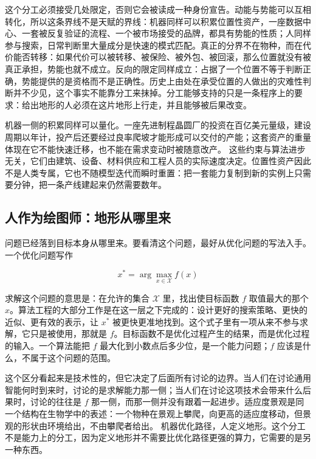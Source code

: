 这个分工必须接受几处限定，否则它会被读成一种身份宣告。动能与势能可以互相转化，所以这条界线不是天赋的界线：机器同样可以积累位置性资产，一座数据中心、一套被反复验证的流程、一个被市场接受的品牌，都具有势能的性质；人同样参与搜索，日常判断里大量成分是快速的模式匹配。真正的分界不在物种，而在代价能否转移：如果代价可以被转移、被保险、被外包、被回滚，那么位置就没有被真正承担，势能也就不成立。反向的限定同样成立：占据了一个位置不等于判断正确，势能提供的是资格而不是正确性。历史上由处在承受位置的人做出的灾难性判断并不少见，这个事实不能靠分工来抹掉。分工能够支持的只是一条程序上的要求：给出地形的人必须在这片地形上行走，并且能够被后果改变。

机器一侧的积累同样可以量化。一座先进制程晶圆厂的投资在百亿美元量级，建设周期以年计，投产后还要经过良率爬坡才能形成可以交付的产能；这套资产的重量体现在它不能快速迁移，也不能在需求变动时被随意改产。\cite{verheyde2019tsmc} 这些约束与算法进步无关，它们由建筑、设备、材料供应和工程人员的实际速度决定。位置性资产因此不是人类专属，它也不随模型迭代而瞬时重置：把一套能力复制到新的实例上只需要分钟，把一条产线建起来仍然需要数年。

\subsection{人作为绘图师：地形从哪里来}

问题已经落到目标本身从哪里来。要看清这个问题，最好从优化问题的写法入手。一个优化问题写作

\begin{equation}
x^{*} = \arg\max_{x \in \mathcal{X}} f(x)
\end{equation}

求解这个问题的意思是：在允许的集合 $\mathcal{X}$ 里，找出使目标函数 $f$ 取值最大的那个 $x$。算法工程的大部分工作是在这一层之下完成的：设计更好的搜索策略、更快的近似、更有效的表示，让 $x^{*}$ 被更快更准地找到。这个式子里有一项从来不参与求解，它只是被使用，那就是 $f$。目标函数不是优化过程产生的结果，而是优化过程的输入。一个算法能把 $f$ 最大化到小数点后多少位，是一个能力问题；$f$ 应该是什么，不属于这个问题的范围。

这个区分看起来是技术性的，但它决定了后面所有讨论的边界。当人们在讨论通用智能何时到来时，讨论的是求解能力那一侧；当人们在讨论这项技术会带来什么后果时，讨论的往往是 $f$ 那一侧，而那一侧并没有跟着一起进步。适应度景观是同一个结构在生物学中的表述：一个物种在景观上攀爬，向更高的适应度移动，但景观的形状由环境给出，不由攀爬者给出。\cite{kauffman1993} 机器优化路径，人定义地形。这个分工不是能力上的分工，因为定义地形并不需要比优化路径更强的算力，它需要的是另一种东西。

